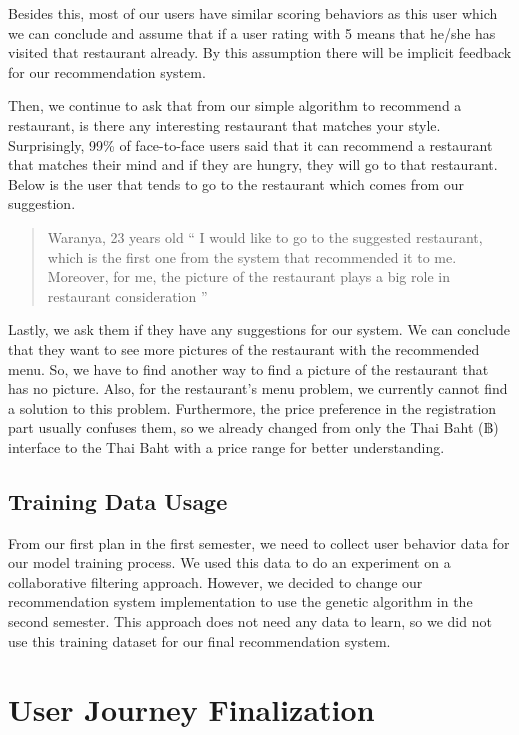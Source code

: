 \documentclass[12pt,oneside,openright,a4paper]{cpe-english-project}
\begin{document}
Besides this, most of our users have similar scoring behaviors as this user which we can conclude and assume that if a user rating with 5 means that he/she has visited that restaurant already. By this assumption there will be implicit feedback for our recommendation system.

Then, we continue to ask that from our simple algorithm to recommend a restaurant, is there any interesting restaurant that matches your style. Surprisingly, 99\% of face-to-face users said that it can recommend a restaurant that matches their mind and if they are hungry, they will go to that restaurant. Below is the user that tends to go to the restaurant which comes from our suggestion.

\begin{quote}{Waranya, 23 years old}
“ I would like to go to the suggested restaurant, which is the first one from the system that recommended it to me. Moreover, for me, the picture of the restaurant plays a big role in restaurant consideration ”
\end{quote}

Lastly, we ask them if they have any suggestions for our system. We can conclude that they want to see more pictures of the restaurant with the recommended menu. So, we have to find another way to find a picture of the restaurant that has no picture. Also, for the restaurant’s menu problem, we currently cannot find a solution to this problem. Furthermore, the price preference in the registration part usually confuses them, so we already changed from only the Thai Baht (฿) interface to the Thai Baht with a price range for better understanding.

\subsection{Training Data Usage}

From our first plan in the first semester, we need to collect user behavior data for our model training process. We used this data to do an experiment on a collaborative filtering approach. However, we decided to change our recommendation system implementation to use the genetic algorithm in the second semester. This approach does not need any data to learn, so we did not use this training dataset for our final recommendation system.


\section{User Journey Finalization}
\end{document}
